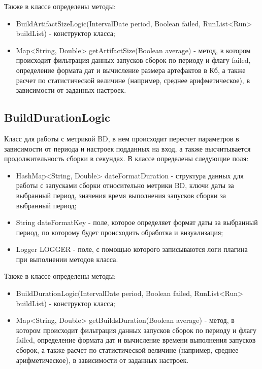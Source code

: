 Также в классе определены методы:

\begin{itemize}
	\item BuildArtifactSizeLogic(IntervalDate period, Boolean failed, RunList<Run> buildList) - конструктор класса;
	\item Map<String, Double> getArtifactSize(Boolean average) - метод, в котором происходит фильтрация данных запусков сборок по периоду и флагу failed, определение формата дат и вычисление размера артефактов в Кб, а также расчет по статистической величине (например, среднее арифметическое), в зависимости от заданных настроек.
\end{itemize}

\subsection{BuildDurationLogic}

Класс для работы с метрикой BD, в нем происходит пересчет параметров в зависимости от периода и настроек подданных на вход, а также высчитывается продолжительность сборки в секундах. В классе определены следующие поля:

\begin{itemize}
	\item HashMap<String, Double> dateFormatDuration - структура данных для работы с запусками сборки относительно метрики BD, ключи даты за выбранный период, значения время выполнения запусков сборки за выбранный период;
	\item String dateFormatKey - поле, которое определяет формат даты за выбранный период, по которому будет происходить обработка и визуализация;
	\item Logger LOGGER - поле, с помощью которого записываются логи плагина при выполнении методов класса.
\end{itemize}

Также в классе определены методы:

\begin{itemize}
	\item BuildDurationLogic(IntervalDate period, Boolean failed, RunList<Run> buildList) - конструктор класса;
	\item Map<String, Double> getBuildsDuration(Boolean average) - метод, в котором происходит фильтрация данных запусков сборок по периоду и флагу failed, определение формата дат и вычисление времени выполнения запусков сборок, а также расчет по статистической величине (например, среднее арифметическое), в зависимости от заданных настроек.
\end{itemize}

